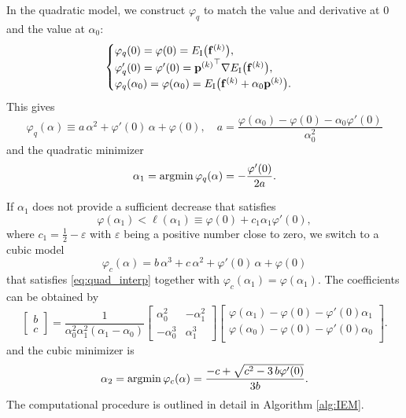 \documentclass[11pt,a4paper]{article}
\begin{document}
In the quadratic model, we construct $\varphi_q$ to match the value and derivative at $0$ and the value at $\alpha_0$:
\begin{equation}
\begin{cases}
\varphi_q(0) = \varphi(0) = E_\mathrm{I}\big(\mathbf{f}^{(k)}\big), \\
\varphi_q'(0) = \varphi'(0) 
= {{\mathbf{p}}^{(k)}}^\top \nabla E_\mathrm{I}\big(\mathbf{f}^{(k)}\big), \\
\varphi_q(\alpha_{0}) = \varphi(\alpha_{0}) = E_{\mathrm{I}}\big(\mathbf{f}^{(k)} + \alpha_{0} {\mathbf{p}}^{(k)}\big).
\end{cases}
\label{eq:quad_interp}
\end{equation}
This gives
\begin{equation} 
\varphi_q(\alpha) \equiv a \, \alpha^2 + \varphi'(0) \, \alpha + \varphi(0), \quad a= \frac{\varphi(\alpha_0) - \varphi(0) - \alpha_0 \varphi'(0)  }{\alpha_0^2}
\label{eq:quad_model}
\end{equation}
and the quadratic minimizer
\begin{equation} 
\alpha_1 = \argmin \varphi_q(\alpha) = -\frac{\varphi'(0)}{2a}.
\label{eq:quad_step}
\end{equation}


If $\alpha_1$ does not provide a sufficient decrease that satisfies
\begin{equation}
\varphi(\alpha_1) < \ell(\alpha_1) \equiv \varphi(0) + c_1 \alpha_1 \varphi'(0),
\label{eq:decreas_cond}
\end{equation}
where $c_1 = \tfrac{1}{2} - \varepsilon$ with $\varepsilon$ being a positive number close to zero, we switch to a cubic model 
\begin{equation} 
\varphi_c(\alpha)  = b \, \alpha^3 + c \, \alpha^2 + \varphi'(0) \, \alpha + \varphi(0)
\label{eq:cubic_model}
\end{equation}
that satisfies \eqref{eq:quad_interp} together with $\varphi_c(\alpha_1) = \varphi(\alpha_1)$. The coefficients can be obtained by
\begin{equation}
\begin{bmatrix}
b\\
c
\end{bmatrix} = \frac{1}{\alpha_0^2 \alpha_1^2 (\alpha_1 - \alpha_0)}
\begin{bmatrix}
    \alpha_0^2  &  - \alpha_1^2\\
    -\alpha_0^3 &  \alpha_1^3
\end{bmatrix}
\begin{bmatrix}
\varphi(\alpha_1) - \varphi(0) - \varphi'(0) \alpha_1\\
\varphi(\alpha_0) - \varphi(0) - \varphi'(0) \alpha_0\\
\end{bmatrix}.  
\end{equation}
and the cubic minimizer is
\begin{equation}
\alpha_2 = \argmin \varphi_c(\alpha) =  \frac{-c + \sqrt{c^2 - 3 \,b \varphi'(0)}}{3 b}.
\label{eq:cubic_step}
\end{equation}
The computational procedure is outlined in detail in Algorithm \ref{alg:IEM}.
\end{document}
